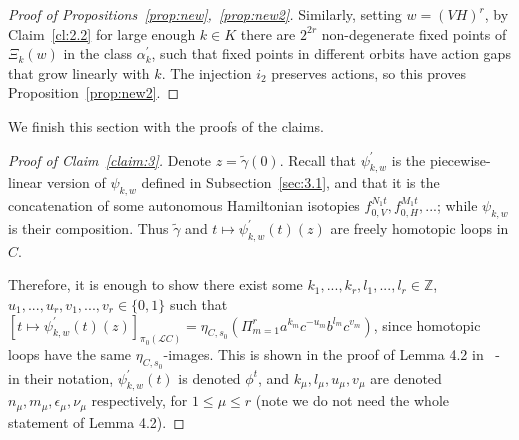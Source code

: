 \documentclass[11pt]{article}
\newcommand{\Z}{\mathbb{Z}}
\begin{document}
\begin{proof}[Proof of Propositions~\ref{prop:new},~\ref{prop:new2}]
                Similarly, setting $w = (VH)^r$, by Claim~\ref{cl:2.2} for large enough $k \in K$ there are $2^{2r}$ non-degenerate fixed points of $\Xi_k(w)$ in the class $\alpha_k^\prime$, such that fixed points in different orbits have action gaps that grow linearly with $k$. The injection $i_2$ preserves actions, so this proves Proposition~\ref{prop:new2}.
            \end{proof}
            
            We finish this section with the proofs of the claims.
            
            \begin{proof}[Proof of Claim~\ref{claim:3}]
                Denote $z = \tilde{\gamma}(0)$. Recall that $\psi_{k,w}^\prime$ is the piecewise-linear version of $\psi_{k,w}$ defined in Subsection~\ref{sec:3.1}, and that it is the concatenation of some autonomous Hamiltonian isotopies $f_{0,V}^{N_1t}, f_{0,H}^{M_1t}, ...$; while $\psi_{k,w}$ is their composition. Thus $\tilde{\gamma}$ and $t \mapsto \psi_{k,w}^\prime(t) (z)$ are freely homotopic loops in $C$.
                
                Therefore, it is enough to show there exist some $k_1,...,k_r, l_1,...,l_r \in \Z$, $u_1,...,u_r, v_1,...,v_r \in \{0,1\}$ such that $[t \mapsto \psi_{k,w}^\prime(t) (z)]_{\pi_0(\mathscr{L}C)} = \eta_{C,s_0}(\Pi_{m=1}^r a^{k_m} c^{-u_m} b^{l_m} c^{v_m})$, since homotopic loops have the same $\eta_{C,s_0}$-images. This is shown in the proof of Lemma 4.2 in~\cite{10} - in their notation, $\psi_{k,w}^\prime(t)$ is denoted $\phi^t$, and $k_\mu, l_\mu, u_\mu, v_\mu$ are denoted $n_\mu, m_\mu, \epsilon_\mu, \nu_\mu$ respectively, for $1 \leq \mu \leq r$ (note we do not need the whole statement of Lemma 4.2).
            \end{proof}
            
\end{document}
